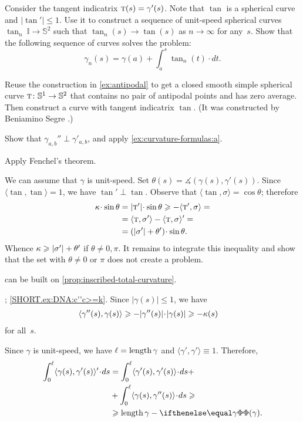 \begin{multicols}{2}
Consider the tangent indicatrix $\tan(s)\z=\gamma'(s)$.
Note that $\tan$ is a spherical curve and $|\tan'|\le 1$.
Use it to construct a sequence of unit-speed spherical curves $\tan_n\:\mathbb{I}\to\mathbb{S}^2$ such that $\tan_n(s)\to \tan(s)$ as $n\to\infty$ for any~$s$.
Show that the following sequence of curves solves the problem:
\[\gamma_n(s)=\gamma(a)+\int_a^s\tan_n(t)\cdot dt.\]

Reuse the construction in \ref{ex:antipodal} to get a closed smooth simple spherical curve $\tan\:\mathbb{S}^1\z\to\mathbb{S}^2$ that contains no pair of antipodal points and has zero average.
Then construct a curve with tangent indicatrix $\tan$.
(It was constructed by Beniamino Segre \cite{segre}.)

Show that $\gamma_{a,b}''\perp \gamma'_{a,b}$, and apply \ref{ex:curvature-formulas:a}.

 Apply Fenchel's theorem.

We can assume that $\gamma$ is unit-speed.
Set $\theta(s)=\measuredangle(\gamma(s),\gamma'(s))$.
Since $\langle\tan,\tan\rangle=1$, we have $\tan'\perp \tan$.
Observe that $\langle \tan,\sigma\rangle=\cos\theta$;
therefore
\begin{align*}
\kur\cdot \sin\theta
&=|\tan'|\cdot \sin\theta\ge
-\langle \tan',\sigma\rangle=
\\
&=
\langle \tan,\sigma'\rangle-\langle \tan,\sigma\rangle'=
\\
&=
(|\sigma'|+\theta')\cdot \sin\theta.
\end{align*}
Whence $\kappa\geqslant |\sigma'|+\theta'$
if $\theta\ne0,\pi$.
It remains to integrate this inequality and show that the set with $\theta\ne0$ or $\pi$ does not create a problem.

 can be built on \ref{prop:inscribed-total-curvature}.

\parbf{\ref{ex:DNA}}; \ref{SHORT.ex:DNA:c''c>=k}.
Since $|\gamma(s)|\le 1$, we have
\begin{align*}
\langle\gamma''(s),\gamma(s)\rangle&\ge -|\gamma''(s)|\cdot|\gamma(s)|\ge-\kur(s)
\end{align*}
for all~$s$.

Since $\gamma$ is unit-speed, we have $\ell=\mathop{\rm length}\nolimits\gamma$ and $\langle\gamma',\gamma'\rangle\equiv1$.
Therefore,
\begin{align*}
\int_0^\ell\langle\gamma(s),\gamma'(s)\rangle'\cdot ds
&=
\int_0^\ell\langle\gamma'(s),\gamma'(s)\rangle\cdot ds+
\\
&+\int_0^\ell\langle\gamma(s),\gamma''(s)\rangle\cdot ds\ge
\\
&\ge \length\gamma-\tc\gamma.
\end{align*}


\end{multicols}
